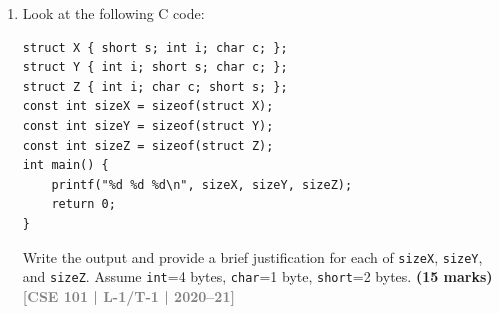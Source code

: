 \documentclass[12pt,a3paper]{article}
\newcommand{\yr}[1]{\hfill\textcolor{gray}{\small\textbf{[#1]}}}
\newcommand{\mk}[1]{\textcolor{orange!70!black}{\small\textbf{(#1 marks)}}}
\begin{document}
\begin{enumerate}
\begin{lstlisting}
#define TOTAL_ACCOUNTS_AT_MOST 1000
#define TOTAL_TRANSACTIONS_AT_MOST 10000

typedef enum {
    SAVINGS,
    CURRENT
} AccountType;

typedef enum {
    WITHDRAW,
    DEPOSIT,
    TRANSFER
} TransactionType;

typedef struct {
    int date;
    int month;
    int year;
} Date;

typedef struct {
    Date date;
    int hour;
    int mins;
    int seconds;
} Time;

typedef struct {
    char *name;
    int accountNumber;
    int balance;
    AccountType type;
    Date dob;
    Time openingTime;
} Account;

typedef struct {
    Account *sentFrom;
    Account *sentTo;
    Time time;
    int amount;
    TransactionType type;
} Transaction;

Account* allAccounts[TOTAL_ACCOUNTS_AT_MOST];
Transaction* allTransactions[TOTAL_TRANSACTIONS_AT_MOST];

Time getCurrentTime();

// create an account and add the account to allAccounts array
// set account opening time by calling the function getCurrentTime
Account *createAccount(char *name, int accountNumber, int initialBalance, AccountType type, Date dob);

// search for the account number given.
Account *searchAccount(int accountNumber);

// add balance to an accountNumber. Add a transaction to the allTrasanctions array
void addBalance(int account, int amount);

// withdraw balance. Add a transaction to the allTrasanctions array
void withdrawBalance(int account, int amount);

// transfer balance from one account to another account. Add a transaction to the allTrasanctions array
void transferBalance(int from, int to, int amount);

// print all transactions of an account
void printTransactions(int account);
\end{lstlisting}
You cannot change any function prototypes.
\mk{25} \yr{CSE 101 | L-1/T-1 | 2021--22}

\item Look at the following C code:
 
\begin{lstlisting}
struct X { short s; int i; char c; };
struct Y { int i; short s; char c; };
struct Z { int i; char c; short s; };
const int sizeX = sizeof(struct X);
const int sizeY = sizeof(struct Y);
const int sizeZ = sizeof(struct Z);
int main() {
    printf("%d %d %d\n", sizeX, sizeY, sizeZ);
    return 0;
}
\end{lstlisting}
Write the output and provide a brief justification for each of \texttt{sizeX}, \texttt{sizeY}, and \texttt{sizeZ}. Assume \texttt{int}=4 bytes, \texttt{char}=1 byte, \texttt{short}=2 bytes.
\mk{15} \yr{CSE 101 | L-1/T-1 | 2020--21}


\end{enumerate}
\end{document}
